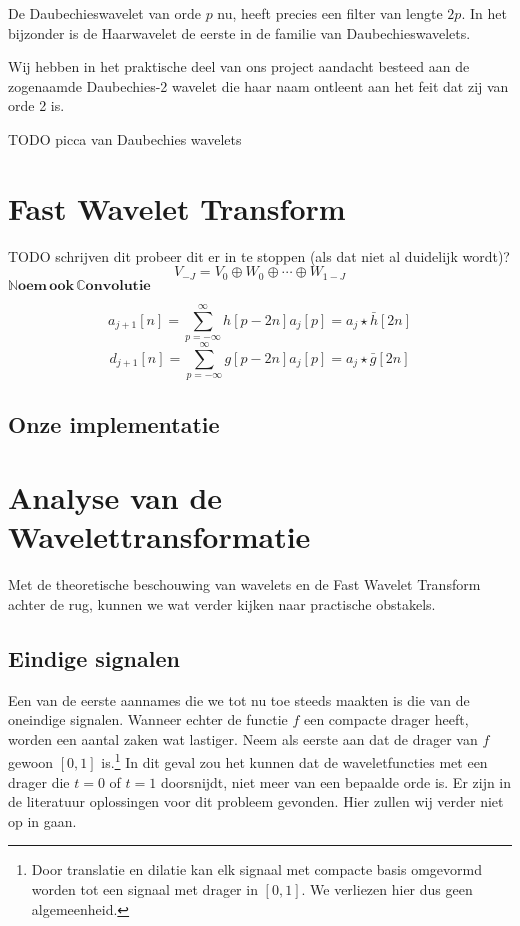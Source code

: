 \documentclass[11pt]{report}
\theoremstyle{plain}
\theoremstyle{definition}
\theoremstyle{remark}
\newcommand{\N}{\mathbb{N}}
\newcommand{\C}{\mathbb{C}}
\begin{document}
De Daubechieswavelet van orde $p$ nu, heeft precies een filter van lengte $2p$. In het bijzonder is de Haarwavelet de eerste in de familie van Daubechieswavelets.

Wij hebben in het praktische deel van ons project aandacht besteed aan de zogenaamde Daubechies-2 wavelet die haar naam ontleent aan het feit dat zij van orde 2 is.

TODO picca van Daubechies wavelets

\section{Fast Wavelet Transform}
TODO schrijven dit
probeer dit er in te stoppen (als dat niet al duidelijk wordt)?
\[
	V_{-J} = V_0 \oplus W_0 \oplus \cdots \oplus W_{1-J}
\]
$\boldsymbol{\N oem\, ook\, \C onvolutie}$

\begin{equation}
\label{approx}
	a_{j+1}[n] = \sum_{p=-\infty}^\infty h[p-2n] a_j[p] = a_j \star \bar{h}[2n]
\end{equation}
\begin{equation}
\label{detail}
	d_{j+1}[n] = \sum_{p=-\infty}^\infty g[p-2n] a_j[p] = a_j \star \bar{g}[2n]
\end{equation}

\subsection{Onze implementatie}

\section{Analyse van de Wavelettransformatie}
Met de theoretische beschouwing van wavelets en de Fast Wavelet Transform achter de rug, kunnen we wat verder kijken naar practische obstakels.

\subsection{Eindige signalen} 
Een van de eerste aannames die we tot nu toe steeds maakten is die van de oneindige signalen. Wanneer echter de functie $f$ een compacte drager heeft, worden een aantal zaken wat lastiger. Neem als eerste aan dat de drager van $f$ gewoon $[0,1]$ is.\footnote{Door translatie en dilatie kan elk signaal met compacte basis omgevormd worden tot een signaal met drager in $[0,1]$. We verliezen hier dus geen algemeenheid.} In dit geval zou het kunnen dat de waveletfuncties met een drager die $t=0$ of $t=1$ doorsnijdt, niet meer van een bepaalde orde is. Er zijn in de literatuur oplossingen voor dit probleem gevonden. Hier zullen wij verder niet op in gaan.
\end{document}
